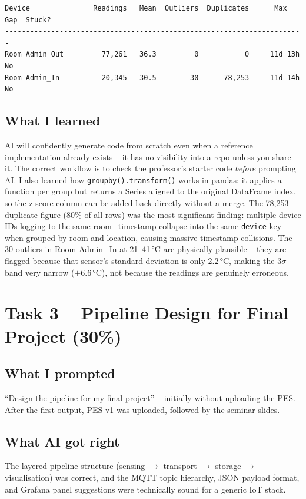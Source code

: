 \documentclass[11pt, letterpaper]{article}
\begin{document}
\begin{lstlisting}
Device               Readings   Mean  Outliers  Duplicates      Max Gap  Stuck?
-----------------------------------------------------------------------
Room Admin_Out         77,261   36.3         0           0     11d 13h      No
Room Admin_In          20,345   30.5        30      78,253     11d 14h      No
\end{lstlisting}

\subsection{What I learned}
AI will confidently generate code from scratch even when a reference implementation
already exists -- it has no visibility into a repo unless you share it. The correct
workflow is to check the professor's starter code \textit{before} prompting AI.
I also learned how \texttt{groupby().transform()} works in pandas: it applies a
function per group but returns a Series aligned to the original DataFrame index, so
the z-score column can be added back directly without a merge.
The 78,253 duplicate figure (80\% of all rows) was the most significant finding:
multiple device IDs logging to the same room+timestamp collapse into the same
\texttt{device} key when grouped by room and location, causing massive timestamp
collisions. The 30 outliers in Room Admin\_In at 21--41\,°C are physically plausible
-- they are flagged because that sensor's standard deviation is only 2.2\,°C, making
the $3\sigma$ band very narrow ($\pm$6.6\,°C), not because the readings are genuinely
erroneous.

\section{Task 3 -- Pipeline Design for Final Project (30\%)}

\subsection{What I prompted}
``Design the pipeline for my final project'' -- initially without uploading the PES.
After the first output, PES v1 was uploaded, followed by the seminar slides.

\subsection{What AI got right}
The layered pipeline structure (sensing $\to$ transport $\to$ storage $\to$
visualisation) was correct, and the MQTT topic hierarchy, JSON payload format, and
Grafana panel suggestions were technically sound for a generic IoT stack.
\end{document}

